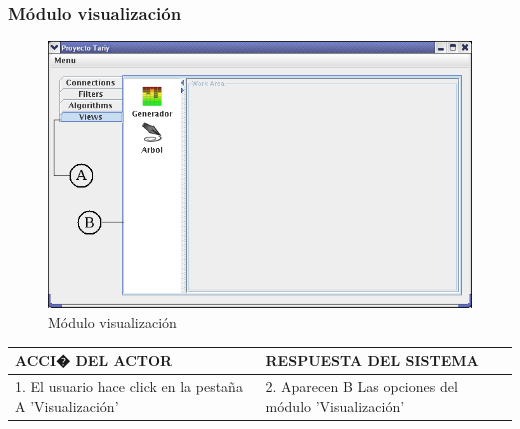 \subsubsection{M\'odulo visualizaci\'on}
\begin{figure}[ht]
\centering
\includegraphics[width=1\textwidth]{images/04.png}
\caption{M\'odulo visualizaci\'on}
\end{figure}
\begin{center}
\begin{tabular}{|p{60mm}|p{60mm}|} \hline
ACCI� DEL ACTOR & RESPUESTA DEL SISTEMA \\ \hline
1. El usuario hace click en la pesta\~na A 'Visualizaci\'on' & 2. Aparecen B Las opciones del m\'odulo 'Visualizaci\'on' \\ \hline
\end{tabular}
\end{center}

\newpage
